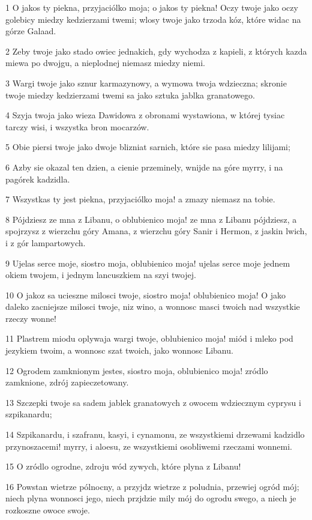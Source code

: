 \par 1 O jakos ty piekna, przyjaciólko moja; o jakos ty piekna! Oczy twoje jako oczy golebicy miedzy kedzierzami twemi; wlosy twoje jako trzoda kóz, które widac na górze Galaad.
\par 2 Zeby twoje jako stado owiec jednakich, gdy wychodza z kapieli, z których kazda miewa po dwojgu, a nieplodnej niemasz miedzy niemi.
\par 3 Wargi twoje jako sznur karmazynowy, a wymowa twoja wdzieczna; skronie twoje miedzy kedzierzami twemi sa jako sztuka jablka granatowego.
\par 4 Szyja twoja jako wieza Dawidowa z obronami wystawiona, w której tysiac tarczy wisi, i wszystka bron mocarzów.
\par 5 Obie piersi twoje jako dwoje blizniat sarnich, które sie pasa miedzy lilijami;
\par 6 Azby sie okazal ten dzien, a cienie przeminely, wnijde na góre myrry, i na pagórek kadzidla.
\par 7 Wszystkas ty jest piekna, przyjaciólko moja! a zmazy niemasz na tobie.
\par 8 Pójdziesz ze mna z Libanu, o oblubienico moja! ze mna z Libanu pójdziesz, a spojrzysz z wierzchu góry Amana, z wierzchu góry Sanir i Hermon, z jaskin lwich, i z gór lampartowych.
\par 9 Ujelas serce moje, siostro moja, oblubienico moja! ujelas serce moje jednem okiem twojem, i jednym lancuszkiem na szyi twojej.
\par 10 O jakoz sa ucieszne milosci twoje, siostro moja! oblubienico moja! O jako daleko zacniejsze milosci twoje, niz wino, a wonnosc masci twoich nad wszystkie rzeczy wonne!
\par 11 Plastrem miodu oplywaja wargi twoje, oblubienico moja! miód i mleko pod jezykiem twoim, a wonnosc szat twoich, jako wonnosc Libanu.
\par 12 Ogrodem zamknionym jestes, siostro moja, oblubienico moja! zródlo zamknione, zdrój zapieczetowany.
\par 13 Szczepki twoje sa sadem jablek granatowych z owocem wdziecznym cyprysu i szpikanardu;
\par 14 Szpikanardu, i szafranu, kasyi, i cynamonu, ze wszystkiemi drzewami kadzidlo przynoszacemi! myrry, i aloesu, ze wszystkiemi osobliwemi rzeczami wonnemi.
\par 15 O zródlo ogrodne, zdroju wód zywych, które plyna z Libanu!
\par 16 Powstan wietrze pólnocny, a przyjdz wietrze z poludnia, przewiej ogród mój; niech plyna wonnosci jego, niech przjdzie mily mój do ogrodu swego, a niech je rozkoszne owoce swoje.

